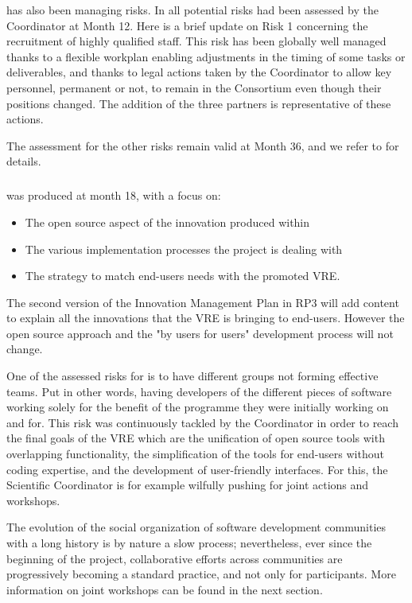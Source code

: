  has also been managing risks. In 
all potential risks had been assessed by the Coordinator at Month 12.
Here is a brief update on Risk 1 concerning the recruitment of highly
qualified staff. This risk has been globally well managed thanks to a
flexible workplan enabling adjustments in the timing of some tasks or
deliverables, and thanks to legal actions taken by the Coordinator to
allow key personnel, permanent or not, to remain in the Consortium
even though their positions changed. The addition of the three
partners is representative of these actions.

The assessment for the
other risks remain valid at Month 36, and we refer to
 for details.

\subparagraph{}

 was produced at month 18, with a focus on:

\begin{itemize}
\item{The open source aspect of the innovation produced within \ODK}
\item{The various implementation processes the project is dealing with}
\item{The strategy to match end-users needs with the promoted VRE}.
\end{itemize}

The second version of the Innovation Management Plan in RP3 will add content
to explain all the innovations that the VRE is bringing to end-users.
However the open source approach and the "by users for users"
development process will not change.

One of the assessed risks for
\ODK is to have different groups not forming effective teams. Put in
other words, having developers of the different pieces of software
working solely for the benefit of the programme they were initially
working on and for. This risk was continuously tackled by the
Coordinator in order to reach the final goals of the VRE which are the
unification of open source tools with overlapping functionality, the
simplification of the tools for end-users without coding expertise,
and the development of user-friendly interfaces. For this, the
Scientific Coordinator is for example wilfully pushing for joint
actions and workshops.

The evolution of the social organization of software development
communities with a long history is by nature a slow process;
nevertheless, ever since the beginning of the project, collaborative
efforts across communities are progressively becoming a standard
practice, and not only for \ODK participants. More information on
joint workshops can be found in the next section.


